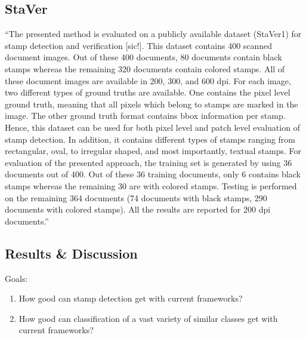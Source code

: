 \subsection{StaVer}\label{sect:staver}
``The presented method is evaluated on a publicly available dataset (StaVer1) for stamp
detection and verification [sic!]. This dataset contains 400 scanned document images. Out
of these 400 documents, 80 documents contain black stamps whereas the remaining 320
documents contain colored stamps. All of these document images are available in 200,
300, and 600 dpi. For each image, two different types of ground truths are available.
One contains the pixel level ground truth, meaning that all pixels which belong to
stamps are marked in the image. The other ground truth format contains \gls{bbox}
information per stamp. Hence, this dataset can be used for both pixel level and
patch level evaluation of stamp detection. In addition, it contains different types of
stamps ranging from rectangular, oval, to irregular shaped, and most importantly, textual
stamps.
For evaluation of the presented approach, the training set is generated by using 36 documents
out of 400. Out of these 36 training documents, only 6 contains black stamps
whereas the remaining 30 are with colored stamps. Testing is performed on the remaining
364 documents (74 documents with black stamps, 290 documents with colored stamps).
All the results are reported for 200 dpi documents.''~\cite{Ahmed.2016}

\subsection{Results \& Discussion}\label{sect:results-and-discussion}
Goals: 
\begin{enumerate}
    \item How good can stamp detection get with current frameworks?
    \item How good can classification of a vast variety of similar classes get
    with current frameworks?
\end{enumerate}